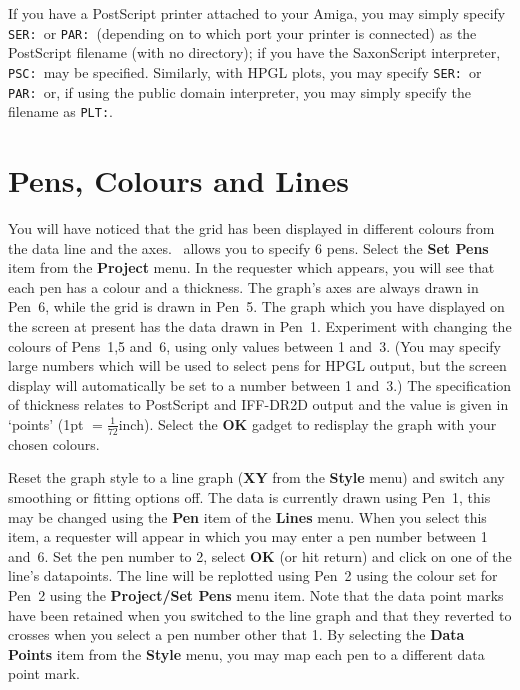 If you have a PostScript printer attached to your Amiga, you may simply specify {\tt 
SER:}\ or {\tt PAR:}\ (depending on to which port your printer is connected) as 
the PostScript filename (with no directory); if you have the SaxonScript 
interpreter, {\tt PSC:}\ may be specified. Similarly, with HPGL plots, you may 
specify {\tt SER:}\ or {\tt PAR:}\ or, if using the public domain interpreter, you 
may simply specify the filename as {\tt PLT:}.









\section{Pens, Colours and Lines}
\label{sect:pens}
You will have noticed that the grid has been displayed 
in different colours from the data line and the axes. \amplot\ allows you to specify 
6 pens. Select the {\bf Set Pens} item from the {\bf Project} menu. In the 
requester which appears, you will see that each pen has a colour and a thickness. 
The graph's axes are always drawn in Pen~6, while the grid is drawn in Pen~5. The 
graph which you have displayed on the screen at present has the data drawn in 
Pen~1. Experiment with changing the colours of Pens~1,5 and~6, using only values 
between 1 and~3. (You may specify large numbers which will be used to select pens for 
HPGL output, but the screen display will automatically be set to a number between 1 
and~3.) The specification of thickness relates to PostScript and IFF-DR2D
output and the value is given in `points' (1pt $= \frac{1}{72}$inch). Select 
the {\bf OK} gadget to redisplay the graph with your chosen colours.

Reset the graph style to a line graph
({\bf XY} from the {\bf Style} menu) and
switch any smoothing or fitting options off.
The data is currently drawn using Pen~1, this may be changed using the {\bf Pen} 
item of the {\bf Lines} menu. When you select this item, a requester will appear 
in which you may enter a pen number between 1 and~6. Set the pen number to 2, 
select {\bf OK} (or hit return) and click on one of the line's datapoints.
The line will be replotted 
using Pen~2 using the colour set for Pen~2 using the {\bf Project/Set Pens} menu item.
Note that the data point marks have been retained when you switched to the line 
graph and that they reverted to crosses when you select a pen number other 
that 1. By selecting the {\bf Data Points} item from the {\bf Style} menu, you 
may map each pen to a different data point mark.

